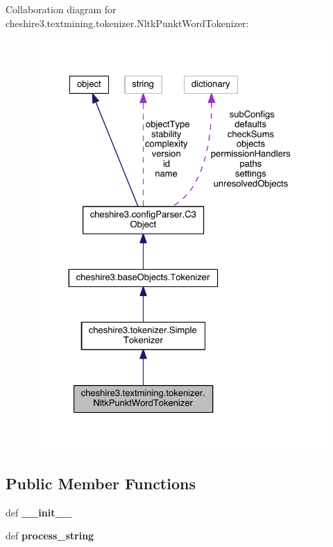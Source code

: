 Collaboration diagram for cheshire3.\-textmining.\-tokenizer.\-Nltk\-Punkt\-Word\-Tokenizer\-:
\nopagebreak
\begin{figure}[H]
\begin{center}
\leavevmode
\includegraphics[width=326pt]{classcheshire3_1_1textmining_1_1tokenizer_1_1_nltk_punkt_word_tokenizer__coll__graph}
\end{center}
\end{figure}
\subsection*{Public Member Functions}
\begin{DoxyCompactItemize}
\item 
\hypertarget{classcheshire3_1_1textmining_1_1tokenizer_1_1_nltk_punkt_word_tokenizer_a52fac2ed94bfd9f997f61968633d276c}{def {\bfseries \-\_\-\-\_\-init\-\_\-\-\_\-}}\label{classcheshire3_1_1textmining_1_1tokenizer_1_1_nltk_punkt_word_tokenizer_a52fac2ed94bfd9f997f61968633d276c}

\item 
\hypertarget{classcheshire3_1_1textmining_1_1tokenizer_1_1_nltk_punkt_word_tokenizer_a41326554bcfc426708089980da5eee0a}{def {\bfseries process\-\_\-string}}\label{classcheshire3_1_1textmining_1_1tokenizer_1_1_nltk_punkt_word_tokenizer_a41326554bcfc426708089980da5eee0a}

\end{DoxyCompactItemize}
